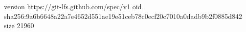 version https://git-lfs.github.com/spec/v1
oid sha256:9a6b6648a22a7e4652d551ae19e51ceb78c0ecf20c7010a0dadb9b2f0885d842
size 21960
